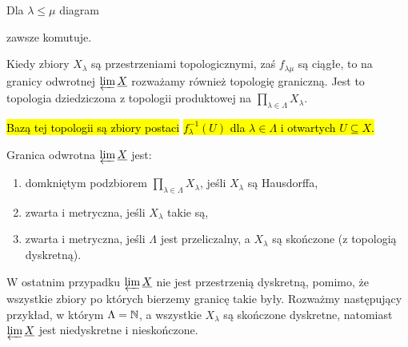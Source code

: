 Dla $\lambda\leq\mu$ diagram 
\begin{center}
\end{center}
zawsze komutuje.


Kiedy zbiory $X_\lambda$ są przestrzeniami topologicznymi, zaś $f_{\lambda\mu}$ są ciągłe, to na granicy odwrotnej $\varprojlim\underline{X}$ rozważamy również topologię graniczną. Jest to topologia dziedziczona z topologii produktowej na $\prod_{\lambda\in\Lambda}X_\lambda$. 

\hl{Bazą tej topologii są zbiory postaci }\hl{$f_\lambda^{-1}(U)$ dla $\lambda\in\Lambda$ i otwartych $U\subseteq X$.}

\begin{fact}{}{}
  Granica odwrotna $\varprojlim\underline{X}$ jest:
  \begin{enumerate}
    \item domkniętym podzbiorem $\prod_{\lambda\in\Lambda}X_\lambda$, jeśli $X_\lambda$ są Hausdorffa,
    \item zwarta i metryczna, jeśli $X_\lambda$ takie są,
    \item zwarta i metryczna, jeśli $\Lambda$ jest przeliczalny, a $X_\lambda$ są skończone (z topologią dyskretną).
  \end{enumerate}
\end{fact}

W ostatnim przypadku $\varprojlim \underline{X}$ nie jest przestrzenią dyskretną, pomimo, że wszystkie zbiory po których bierzemy granicę takie były. Rozważmy następujący przykład, w którym $\Lambda=\mathbb{N}$, a wszystkie $X_\lambda$ są skończone dyskretne, natomiast $\varprojlim \underline{X}$ jest niedyskretne i nieskończone.


